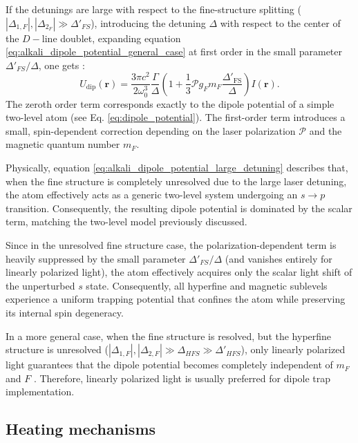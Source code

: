 \vspace{0.5\baselineskip}
If the detunings are large with respect to the fine-structure splitting ($|\Delta_{1,F}|, |\Delta_{2_F}| \gg \Delta'_{FS}$), introducing the detuning $\Delta$ with respect to the center of the $D-$line doublet, expanding equation \eqref{eq:alkali_dipole_potential_general_case} at first order in the small parameter $\Delta'_{FS}/\Delta$, one gets \cite{grimm}:
\begin{equation}
    \label{eq:alkali_dipole_potential_large_detuning}
    U_{\text{dip}}(\mathbf{r}) = \frac{3 \pi c^2}{2 \omega_0^3} \frac{\Gamma}{\Delta} \left( 1 + \frac{1}{3} \mathcal{P} g_F m_F \frac{\Delta'_{\text{FS}}}{\Delta} \right) I(\mathbf{r}).
\end{equation}
The zeroth order term corresponds exactly to the dipole potential of a simple two-level atom (see Eq. \eqref{eq:dipole_potential}). The first-order term introduces a small, spin-dependent correction depending on the laser polarization $\mathcal{P}$ and the magnetic quantum number $m_F$.

Physically, equation \eqref{eq:alkali_dipole_potential_large_detuning} describes that, when the fine structure is completely unresolved due to the large laser detuning, the atom effectively acts as a generic two-level system undergoing an $s \rightarrow p$ transition.
Consequently, the resulting dipole potential is dominated by the scalar term, matching the two-level model previously discussed.

Since in the unresolved fine structure case, the polarization-dependent term is heavily suppressed by the small parameter $\Delta'_{FS}/\Delta$ (and vanishes entirely for linearly polarized light), the atom effectively acquires only the scalar light shift of the unperturbed $s$ state. Consequently, all hyperfine and magnetic sublevels experience a uniform trapping potential that confines the atom while preserving its internal spin degeneracy.

In a more general case, when the fine structure is resolved, but the hyperfine structure is unresolved ($|\Delta_{1,F}|,|\Delta_{2,F}|\gg \Delta_{HFS} \gg \Delta'_{HFS}$), only linearly polarized light guarantees that the dipole potential becomes completely independent of $m_F$ and $F$ \cite{grimm}. Therefore, linearly polarized light is usually preferred for dipole trap implementation.


\subsection{Heating mechanisms}

